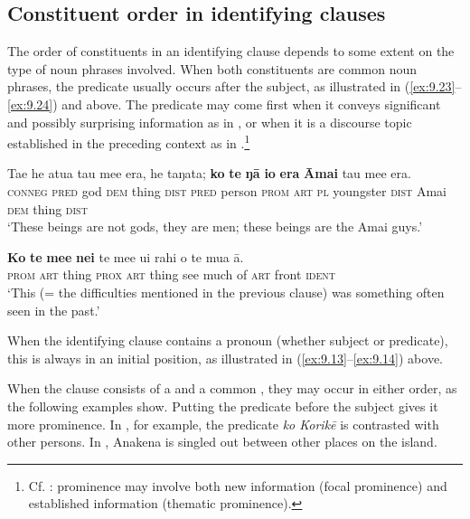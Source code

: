 \subsection{Constituent order in identifying clauses}\label{sec:9.2.4}
The order of constituents in an identifying clause depends to some extent on the type of noun phrases involved. When both constituents are common noun phrases, the predicate usually occurs after the subject, as illustrated in (\ref{ex:9.23}–\ref{ex:9.24}) and  above. The predicate may come first when it conveys significant and possibly surprising information as in , or when it is a discourse topic established in the preceding context as in .\footnote{\label{fn:467}Cf. \citet{Levinsohn2007}: prominence may involve both new information (focal prominence) and established information (thematic prominence).}

\ea\label{ex:9.27}
\gll Ta{\ꞌ}e he {\ꞌ}atua tau me{\ꞌ}e era, he taŋata; \textbf{ko} \textbf{te} \textbf{ŋā} \textbf{io} \textbf{era} \textbf{{\ꞌ}Āmai} tau me{\ꞌ}e era.\\
\textsc{conneg} \textsc{pred} god \textsc{dem} thing \textsc{dist} \textsc{pred} person \textsc{prom} \textsc{art} \textsc{pl} youngster \textsc{dist} Amai \textsc{dem} thing \textsc{dist}\\

\glt 
‘These beings are not gods, they are men; these beings are the Amai guys.’ \textstyleExampleref{[Mtx-7-37.029]}
\z

\ea\label{ex:9.28}
\gll \textbf{Ko} \textbf{te} \textbf{me{\ꞌ}e} \textbf{nei} te me{\ꞌ}e u{\ꞌ}i rahi o te mu{\ꞌ}a {\ꞌ}ā. \\
\textsc{prom} \textsc{art} thing \textsc{prox} \textsc{art} thing see much of \textsc{art} front \textsc{ident} \\

\glt
‘This (= the difficulties mentioned in the previous clause) was something often seen in the past.’ \textstyleExampleref{[R107.009]} 
\z

When the identifying clause contains a pronoun (whether subject or predicate), this is always in an initial position, as illustrated in (\ref{ex:9.13}–\ref{ex:9.14}) above. 

When the clause consists of a  and a common , they may occur in either order, as the following examples show. Putting the predicate before the subject gives it more prominence. In , for example, the predicate \textit{ko Korikē} is contrasted with other persons. In , Anakena is singled out between other places on the island.

